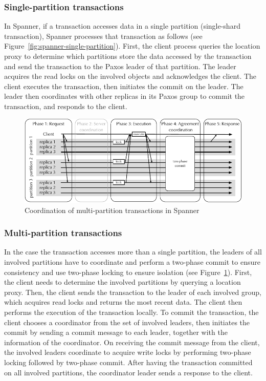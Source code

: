 \subsubsection{Single-partition transactions}
 
In Spanner, if a transaction accesses data in a single partition (single-shard
transaction), Spanner processes that transaction as follows (see
Figure~\ref{fig:spanner-single-partition}). First, the client process queries
the location proxy to determine which partitions store the data accessed by the
transaction and send the transaction to the Paxos leader of that partition. The
leader acquires the read locks on the involved objects and acknowledges the
client. The client executes the transaction, then initiates the commit on the
leader. The leader then coordinates with other replicas in its Paxos group to
commit the transaction, and responds to the client.

\begin{figure}[ht!]
  \begin{minipage}[b]{1.0\linewidth}
  \centering
        \includegraphics[width=1\linewidth]{figures/spanner-multi-partition}
  \end{minipage}
  \caption{Coordination of multi-partition transactions in Spanner}
  \label{fig:spanner-multi-partition}
\end{figure}

\subsubsection{Multi-partition transactions} 
In the case the transaction accesses more than a single partition, the leaders
of all involved partitions have to coordinate and perform a two-phase commit to
ensure consistency and use two-phase locking to ensure isolation (see
Figure~\ref{fig:spanner-multi-partition}). First, the client needs to
determine the involved partitions by querying a location proxy. Then, the client
sends the transaction to the leader of each involved group, which acquires read
locks and returns the most recent data. The client then performs the execution
of the transaction locally. To commit the transaction, the client chooses a
coordinator from the set of involved leaders, then initiates the commit by sending a
commit message to each leader, together with the information of the coordinator.
On receiving the commit message from the client, the involved leaders coordinate to
acquire write locks by performing two-phase locking followed by two-phase
commit. After having the transaction committed on all involved partitions, the
coordinator leader sends a response to the client.

